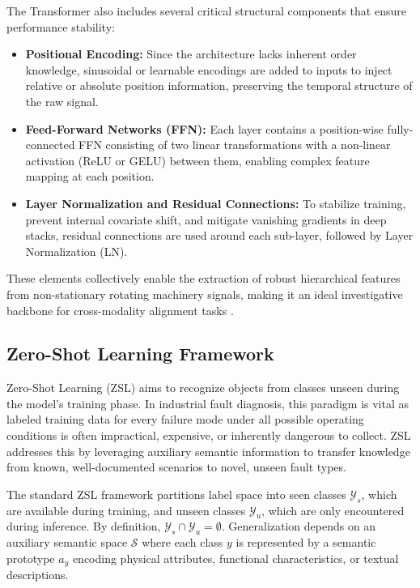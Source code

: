 The Transformer also includes several critical structural components that ensure performance stability:
\begin{itemize}
    \item \textbf{Positional Encoding:} Since the architecture lacks inherent order knowledge, sinusoidal or learnable encodings are added to inputs to inject relative or absolute position information, preserving the temporal structure of the raw signal.
    \item \textbf{Feed-Forward Networks (FFN):} Each layer contains a position-wise fully-connected FFN consisting of two linear transformations with a non-linear activation (ReLU or GELU) between them, enabling complex feature mapping at each position.
    \item \textbf{Layer Normalization and Residual Connections:} To stabilize training, prevent internal covariate shift, and mitigate vanishing gradients in deep stacks, residual connections are used around each sub-layer, followed by Layer Normalization (LN).
\end{itemize}
These elements collectively enable the extraction of robust hierarchical features from non-stationary rotating machinery signals, making it an ideal investigative backbone for cross-modality alignment tasks \cite{transformer_orig, vaswani2017attention}.

\subsection{Zero-Shot Learning Framework}
Zero-Shot Learning (ZSL) aims to recognize objects from classes unseen during the model's training phase. In industrial fault diagnosis, this paradigm is vital as labeled training data for every failure mode under all possible operating conditions is often impractical, expensive, or inherently dangerous to collect. ZSL addresses this by leveraging auxiliary semantic information to transfer knowledge from known, well-documented scenarios to novel, unseen fault types.

The standard ZSL framework partitions label space into seen classes $\mathcal{Y}_s$, which are available during training, and unseen classes $\mathcal{Y}_u$, which are only encountered during inference. By definition, $\mathcal{Y}_s \cap \mathcal{Y}_u = \emptyset$. Generalization depends on an auxiliary semantic space $\mathcal{S}$ where each class $y$ is represented by a semantic prototype $a_y$ encoding physical attributes, functional characteristics, or textual descriptions.

